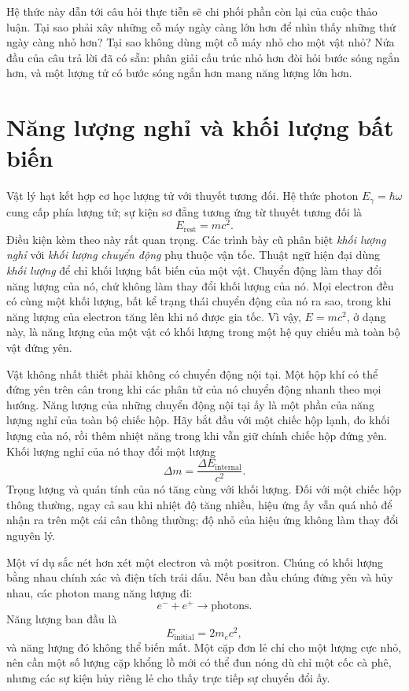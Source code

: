 Hệ thức này dẫn tới câu hỏi thực tiễn sẽ chi phối phần còn lại của cuộc thảo luận. Tại sao phải xây những cỗ máy ngày càng lớn hơn để nhìn thấy những thứ ngày càng nhỏ hơn? Tại sao không dùng một cỗ máy nhỏ cho một vật nhỏ? Nửa đầu của câu trả lời đã có sẵn: phân giải cấu trúc nhỏ hơn đòi hỏi bước sóng ngắn hơn, và một lượng tử có bước sóng ngắn hơn mang năng lượng lớn hơn.

\section{Năng lượng nghỉ và khối lượng bất biến}

Vật lý hạt kết hợp cơ học lượng tử với thuyết tương đối. Hệ thức photon \(E_\gamma=\hbar\omega\) cung cấp phía lượng tử; sự kiện sơ đẳng tương ứng từ thuyết tương đối là
\begin{equation}
E_{\mathrm{rest}}=mc^2.
\end{equation}
Điều kiện kèm theo này rất quan trọng. Các trình bày cũ phân biệt \emph{khối lượng nghỉ} với \emph{khối lượng chuyển động} phụ thuộc vận tốc. Thuật ngữ hiện đại dùng \emph{khối lượng} để chỉ khối lượng bất biến của một vật. Chuyển động làm thay đổi năng lượng của nó, chứ không làm thay đổi khối lượng của nó. Mọi electron đều có cùng một khối lượng, bất kể trạng thái chuyển động của nó ra sao, trong khi năng lượng của electron tăng lên khi nó được gia tốc. Vì vậy, \(E=mc^2\), ở dạng này, là năng lượng của một vật có khối lượng trong một hệ quy chiếu mà toàn bộ vật đứng yên.

Vật không nhất thiết phải không có chuyển động nội tại. Một hộp khí có thể đứng yên trên cân trong khi các phân tử của nó chuyển động nhanh theo mọi hướng. Năng lượng của những chuyển động nội tại ấy là một phần của năng lượng nghỉ của toàn bộ chiếc hộp. Hãy bắt đầu với một chiếc hộp lạnh, đo khối lượng của nó, rồi thêm nhiệt năng trong khi vẫn giữ chính chiếc hộp đứng yên. Khối lượng nghỉ của nó thay đổi một lượng
\begin{equation}
\Delta m=\frac{\Delta E_{\mathrm{internal}}}{c^2}.
\end{equation}
Trọng lượng và quán tính của nó tăng cùng với khối lượng. Đối với một chiếc hộp thông thường, ngay cả sau khi nhiệt độ tăng nhiều, hiệu ứng ấy vẫn quá nhỏ để nhận ra trên một cái cân thông thường; độ nhỏ của hiệu ứng không làm thay đổi nguyên lý.

Một ví dụ sắc nét hơn xét một electron và một positron. Chúng có khối lượng bằng nhau chính xác và điện tích trái dấu. Nếu ban đầu chúng đứng yên và hủy nhau, các photon mang năng lượng đi:
\begin{equation}
e^-+e^+\longrightarrow \text{photons}.
\end{equation}
Năng lượng ban đầu là
\begin{equation}
E_{\mathrm{initial}}=2m_e c^2,
\end{equation}
và năng lượng đó không thể biến mất. Một cặp đơn lẻ chỉ cho một lượng cực nhỏ, nên cần một số lượng cặp khổng lồ mới có thể đun nóng dù chỉ một cốc cà phê, nhưng các sự kiện hủy riêng lẻ cho thấy trực tiếp sự chuyển đổi ấy.

